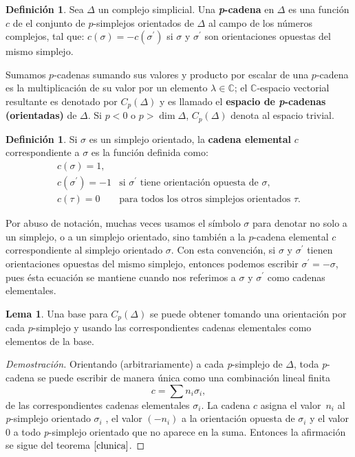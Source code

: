 \documentclass[12pt]{book}
\theoremstyle{definition}
\newtheorem{definition}[theorem]{Definición}
\newtheorem{lemma}[theorem]{Lema}
\newcounter{in}
\newcounter{ini}
\begin{document}
\begin{definition}
  Sea $\Delta$ un complejo simplicial. Una \textbf{\emph{p}-cadena} en
  $\Delta$ es una función $c$ de el conjunto de $p$-simplejos
  orientados de
  $\Delta$ al campo de los números complejos, tal que:
    $c(\sigma)=-c(\sigma^{'})$ si $\sigma$ y $\sigma^{'}$ son
      orientaciones opuestas del mismo simplejo.
\end{definition}


Sumamos $p$-cadenas sumando sus valores y producto por escalar de una
$p$-cadena es la multiplicación de su valor por un elemento $\lambda\in\mathbb{C}$; el $\mathbb{C}$-espacio vectorial resultante es
denotado por $C_{p}(\Delta)$ y es llamado el \textbf{espacio de
  \emph{p}-cadenas (orientadas)} de $\Delta$. Si $p<0$ o $p>\dim \Delta$,
$C_{p}(\Delta)$ denota al espacio trivial.

\begin{definition}
  Si $\sigma$ es un simplejo orientado, la \textbf{cadena elemental} $c$
  correspondiente a $\sigma$ es la función definida como:
  \[ 
  \begin{array}{cl}
    c(\sigma)=1, & \\
    c(\sigma^{'})=-1 & \mbox{si $\sigma^{'}$ tiene orientación opuesta de $\sigma$}, \\
    c(\tau)=0 & \mbox{para todos los otros simplejos orientados $\tau$}. 
  \end{array}\] 
  \end{definition}

Por abuso de notación, muchas veces usamos el símbolo $\sigma$ para
denotar no solo a un simplejo, o a un simplejo orientado, sino también
a la $p$-cadena elemental $c$ correspondiente al simplejo orientado
$\sigma$. Con esta convención, si $\sigma$ y $\sigma^{'}$ tienen
orientaciones opuestas del mismo simplejo, entonces podemos escribir
$\sigma^{'}=-\sigma$, pues ésta ecuación se mantiene cuando nos
referimos a $\sigma$ y $\sigma^{'}$ como cadenas elementales.

\begin{lemma}
   Una base para $C_{p}(\Delta)$ se puede obtener
   tomando una orientación por cada $p$-simplejo y usando las
   correspondientes cadenas elementales como elementos de la base.
\end{lemma}

\begin{proof}[Demostración]
  Orientando (arbitrariamente) a cada \emph{p}-simplejo de $\Delta$,
  toda \emph{p}-cadena se puede escribir de manera única como una
  combinación lineal finita
$$c=\sum n_{i}\sigma_{i},$$
de las correspondientes cadenas elementales $\sigma_{i}$. La cadena
$c$ asigna el valor~$n_{i}$ al \emph{p}-simplejo orientado
$\sigma_{i}$ , el valor $(-n_{i})$ a la orientación opuesta de
$\sigma_{i}$ y el valor $0$ a todo \emph{p}-simplejo orientado que no
aparece en la suma. Entonces la afirmación se sigue del teorema $\ref{clunica}$.
\end{proof}
\end{document}
